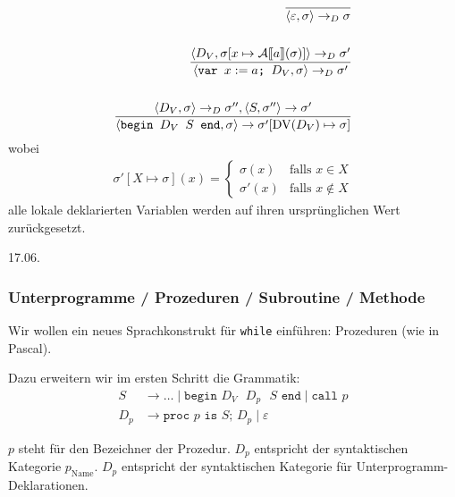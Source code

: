 \begin{align*}
    \frac{}{\langle \varepsilon, \sigma \rangle \to_D \sigma} \\
    \\
    \frac{
        \langle D_V, \sigma[x \mapsto \mathcal{A}\mathrm{[}\kern-.14em\mathrm{[} a\mathrm{]}\kern-.14em\mathrm{]}(\sigma)] \rangle \to_D \sigma'
    }{
        \langle \texttt{var } x := a \texttt{; } D_V, \sigma \rangle \to_D \sigma'
    } \\
    \\
    \frac{
        \langle D_V, \sigma \rangle \to_D \sigma'', \langle S, \sigma'' \rangle \to \sigma'
    }{
        \langle \texttt{begin $D_V$ $S$ end}, \sigma \rangle \to \sigma'[\operatorname{DV}(D_V) \mapsto \sigma]
    }
\end{align*}
wobei
\begin{align*}
    \sigma'[X \mapsto \sigma](x) = \begin{cases}
        \sigma(x) & \text{falls } x \in X \\
        \sigma'(x) & \text{falls } x \not\in X
    \end{cases}
\end{align*}
\dh{} alle lokale deklarierten Variablen werden auf ihren ursprünglichen Wert zurückgesetzt.


\newpage
\hfill 17.06.

\subsubsection{Unterprogramme / Prozeduren / Subroutine / Methode}

Wir wollen ein neues Sprachkonstrukt für \texttt{while} einführen: Prozeduren (wie in Pascal).

Dazu erweitern wir im ersten Schritt die Grammatik:
\begin{align*}
    S & \to \dots \;\vert\; \texttt{begin $D_V$ $D_p$ $S$ end} \;\vert\; \texttt{call $p$} \\
    D_p & \to \texttt{proc $p$ is $S$; $D_p$} \;\vert\; \varepsilon
\end{align*}

$p$ steht für den Bezeichner der Prozedur. $D_p$ entspricht der syntaktischen Kategorie $p_{\text{Name}}$.
$D_p$ entspricht der syntaktischen Kategorie für Unterprogramm-Deklarationen.


